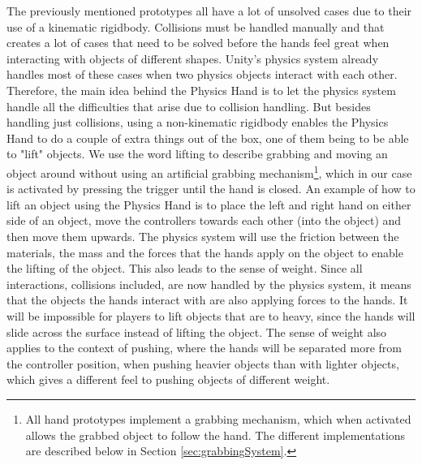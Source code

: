 The previously mentioned prototypes all have a lot of unsolved cases due to their use of a kinematic rigidbody. Collisions must be handled manually and that creates a lot of cases that need to be solved before the hands feel great when interacting with objects of different shapes. Unity's physics system already handles most of these cases when two physics objects interact with each other. Therefore, the main idea behind the Physics Hand is to let the physics system handle all the difficulties that arise due to collision handling. But besides handling just collisions, using a non-kinematic rigidbody enables the Physics Hand to do a couple of extra things out of the box, one of them being to be able to "lift" objects. We use the word lifting to describe grabbing and moving an object around without using an artificial grabbing mechanism\footnote{All hand prototypes implement a grabbing mechanism, which when activated allows the grabbed object to follow the hand. The different implementations are described below in Section \ref{sec:grabbingSystem}.}, which in our case is activated by pressing the trigger until the hand is closed. An example of how to lift an object using the Physics Hand is to place the left and right hand on either side of an object, move the controllers towards each other (into the object) and then move them upwards. The physics system will use the friction between the materials, the mass and the forces that the hands apply on the object to enable the lifting of the object. This also leads to the sense of weight. Since all interactions, collisions included, are now handled by the physics system, it means that the objects the hands interact with are also applying forces to the hands. It will be impossible for players to lift objects that are to heavy, since the hands will slide across the surface instead of lifting the object. The sense of weight also applies to the context of pushing, where the hands will be separated more from the controller position, when pushing heavier objects than with lighter objects, which gives a different feel to pushing objects of different weight.

